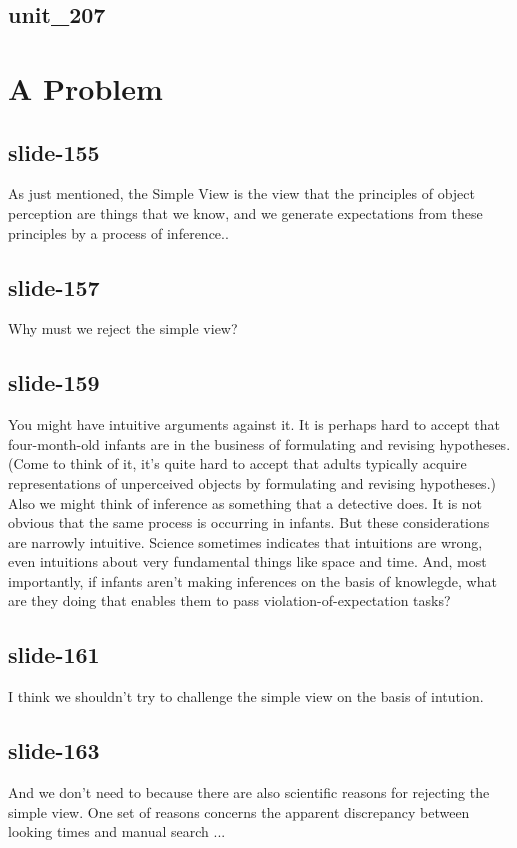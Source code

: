 \documentclass[12pt,\papersize]{extarticle}
\begin{document}
 
\subsection{unit\_207}
 
\section{A Problem}
 
 
\subsection{slide-155}
As just mentioned, the Simple View is the view that the principles of object perception are things that we know, and we generate expectations from these principles by a process of inference..
 
 
\subsection{slide-157}
Why must we reject the simple view?
 
 
\subsection{slide-159}
You might have intuitive arguments against it. It is perhaps hard to accept that four-month-old infants are in the business of formulating and revising hypotheses. (Come to think of it, it’s quite hard to accept that adults typically acquire representations of unperceived objects by formulating and revising hypotheses.) Also we might think of inference as something that a detective does. It is not obvious that the same process is occurring in infants. But these considerations are narrowly intuitive. Science sometimes indicates that intuitions are wrong, even intuitions about very fundamental things like space and time. And, most importantly, if infants aren’t making inferences on the basis of knowlegde, what are they doing that enables them to pass violation-of-expectation tasks?
 
 
\subsection{slide-161}
I think we shouldn't try to challenge the simple view on the basis of intution.
 
 
\subsection{slide-163}
And we don't need to because there are also scientific reasons for rejecting the simple view.
One set of reasons concerns the apparent discrepancy between looking times and manual search ...
 
\end{document}
